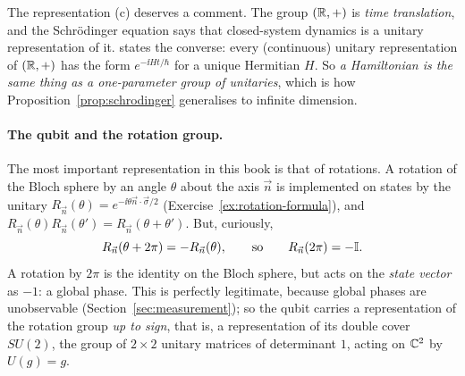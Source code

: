 The representation (c) deserves a comment. The group $(\mathbb{R},+)$ is \emph{time translation}, and the Schr\"odinger equation says that closed-system dynamics is a unitary representation of it.  states the converse: every (continuous) unitary representation of $(\mathbb{R},+)$ has the form $e^{-\ii Ht/\hbar}$ for a unique Hermitian $H$. So \emph{a Hamiltonian is the same thing as a one-parameter group of unitaries}, which is how Proposition~\ref{prop:schrodinger} generalises to infinite dimension.

\paragraph{The qubit and the rotation group.}
The most important representation in this book is that of rotations. A rotation of the Bloch sphere by an angle $\theta$ about the axis $\vec n$ is implemented on states by the unitary $R_{\vec n}(\theta)=e^{-\ii\theta\vec n\cdot\vec\sigma/2}$ (Exercise~\ref{ex:rotation-formula}), and
$R_{\vec n}(\theta)R_{\vec n}(\theta')=R_{\vec n}(\theta+\theta')$. But, curiously,
\[
  R_{\vec n}(\theta+2\pi)=-R_{\vec n}(\theta),\qquad\text{so}\qquad R_{\vec n}(2\pi)=-\mathbb{I} .
\]
A rotation by $2\pi$ is the identity on the Bloch sphere, but acts on the \emph{state vector} as $-1$: a global phase. This is perfectly legitimate, because global phases are unobservable (Section~\ref{sec:measurement}); so the qubit carries a representation of the rotation group \emph{up to sign}, that is,
a representation of its double cover $SU(2)$, the group of $2\times2$ unitary matrices of determinant $1$, acting on $\mathbb{C}^2$ by $U(g)=g$.

